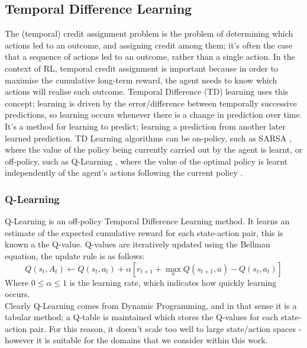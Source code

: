 \subsection{Temporal Difference Learning}
The (temporal) credit assignment problem \cite{Minsky:1961:ire} is the problem of determining which actions led to an outcome, and assigning credit among them; it's often the case that a sequence of actions led to an outcome, rather than a single action. In the context of RL, temporal credit assignment is important because in order to maximise the cumulative long-term reward, the agent needs to know which actions will realise such outcome. Temporal Difference (TD) \cite{10.5555/911176, 5392560, 5391906} learning uses this concept; learning is driven by the error/difference between temporally successive predictions, so learning occurs whenever there is a change in prediction over time. It's a method for learning to predict; learning a prediction from another later learned prediction.
TD Learning algorithms can be on-policy, such as SARSA \cite{rummery:cuedtr94}, where the value of the policy being currently carried out by the agent is learnt, or off-policy, such as Q-Learning \cite{Watkins:1989, journals/ml/WatkinsD92}, where the value of the optimal policy is learnt independently of the agent's actions following the current policy \cite{PooleMackworth17}.
\subsubsection{Q-Learning}
Q-Learning is an off-policy Temporal Difference Learning method. It learns an estimate of the expected cumulative reward for each state-action pair, this is known a the Q-value. Q-values are iteratively updated using the Bellman equation, the update rule is as follows:
$$Q(s_t,A_t) \leftarrow Q(s_t,a_t) + \alpha[r_{t+1} + \max_aQ(s_{t+1}, a) -Q(s_t,a_t)]$$
Where $0 \le \alpha \le 1$ is the learning rate, which indicates how quickly learning occurs.
\\Clearly Q-Learning comes from Dynamic Programming, and in that sense it is a tabular method; a Q-table is maintained which stores the Q-values for each state-action pair. For this reason, it doesn't scale too well to large state/action spaces - however it is suitable for the domains that we consider within this work.

